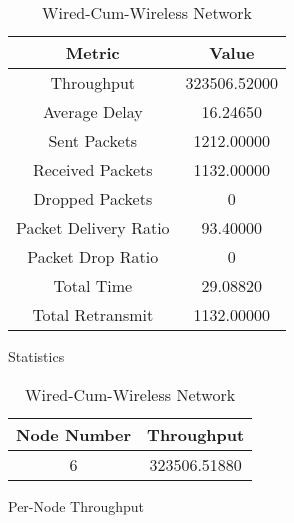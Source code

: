 \newline
\begin{table}[h!]
    \centering
    \begin{subtable}[t]{0.5\textwidth}
    \centering
        
    \begin{tabular}{|c|c|}
        \hline
        \textbf{Metric} & \textbf{Value} \\
        \hline
        Throughput &      323506.52000 \\
        \hline
        Average Delay &         16.24650 \\
        \hline
        Sent Packets &         1212.00000 \\ 
        \hline
        Received Packets &         1132.00000 \\
        \hline
        Dropped Packets &         0 \\
        \hline
        Packet Delivery Ratio &      93.40000 \\
        \hline
        Packet Drop Ratio &      0 \\
        \hline
        Total Time &  29.08820 \\
        \hline
        Total Retransmit &         1132.00000 \\
        \hline
    \end{tabular}
    \caption{Statistics}
        
    \end{subtable}
    \begin{subtable}{0.5\textwidth}
    \centering
        \begin{tabular}{|c|c|}
            \hline
            \textbf{Node Number} & \textbf{Throughput} \\
            \hline
             6 & 323506.51880 \\
            \hline
        \end{tabular}
        \caption{Per-Node Throughput}
        
    \end{subtable}
    \caption{Wired-Cum-Wireless Network}
    \label{tab:1}
\end{table}

    